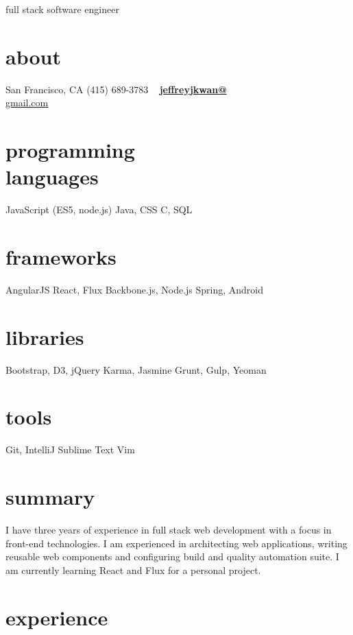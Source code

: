 \documentclass[print]{friggeri-cv}
\begin{document}
       {full stack software engineer}


\begin{aside}
  \section{about}
    San Francisco, CA
    (415) 689-3783
    ~
    \href{mailto:jeffreyjkwan@gmail.com}{\textbf{jeffreyjkwan@}\\gmail.com}
  \section{programming\\languages}
    JavaScript
    (ES5, node.js)
    Java, CSS
    C, SQL
  \section{frameworks}
    AngularJS
    React, Flux
    Backbone.js, Node.js
    Spring, Android
  \section{libraries}
    Bootstrap, D3, jQuery
    Karma, Jasmine
    Grunt, Gulp, Yeoman
  \section{tools}
    Git, IntelliJ
    Sublime Text
    Vim
\end{aside}

\section{summary}

I have three years of experience in full stack web development with a focus in front-end technologies. I am experienced in architecting web applications, writing reusable web components and configuring build and quality automation suite. I am currently learning React and Flux for a personal project.
\\
\section{experience}
\end{document}
